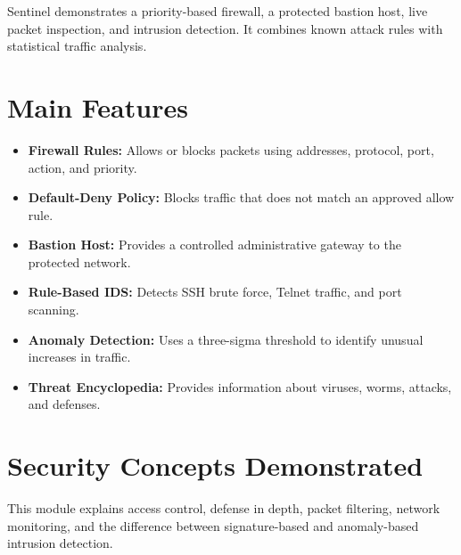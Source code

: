 \documentclass[12pt]{report}
\begin{document}
Sentinel demonstrates a priority-based firewall, a protected bastion host, live packet inspection, and intrusion detection. It combines known attack rules with statistical traffic analysis.

\section*{Main Features}
\begin{itemize}
    \item \textbf{Firewall Rules:} Allows or blocks packets using addresses, protocol, port, action, and priority.
    \item \textbf{Default-Deny Policy:} Blocks traffic that does not match an approved allow rule.
    \item \textbf{Bastion Host:} Provides a controlled administrative gateway to the protected network.
    \item \textbf{Rule-Based IDS:} Detects SSH brute force, Telnet traffic, and port scanning.
    \item \textbf{Anomaly Detection:} Uses a three-sigma threshold to identify unusual increases in traffic.
    \item \textbf{Threat Encyclopedia:} Provides information about viruses, worms, attacks, and defenses.
\end{itemize}

\section*{Security Concepts Demonstrated}
This module explains access control, defense in depth, packet filtering, network monitoring, and the difference between signature-based and anomaly-based intrusion detection.
\end{document}
